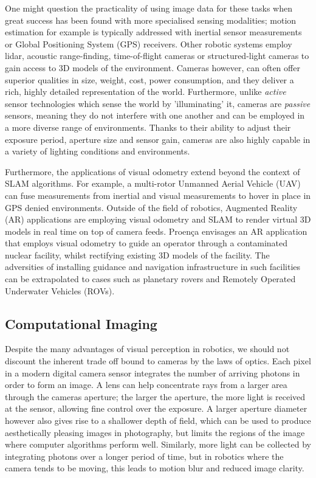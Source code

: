 One might question the practicality of using image data for these tasks when great success has been found with more specialised sensing modalities; motion estimation for example is typically addressed with inertial sensor measurements or Global Positioning System (GPS) receivers. Other robotic systems employ lidar, acoustic range-finding, time-of-flight cameras or structured-light cameras to gain access to 3D models of the environment. Cameras however, can often offer superior qualities in size, weight, cost, power consumption, and they deliver a rich, highly detailed representation of the world. Furthermore, unlike \textit{active} sensor technologies which sense the world by 'illuminating' it, cameras are \textit{passive} sensors, meaning they do not interfere with one another and can be employed in a more diverse range of environments. Thanks to their ability to adjust their exposure period, aperture size and sensor gain, cameras are also highly capable in a variety of lighting conditions and environments. 

Furthermore, the applications of visual odometry extend beyond the context of SLAM algorithms. For example, a multi-rotor Unmanned Aerial Vehicle (UAV) can fuse measurements from inertial and visual measurements to hover in place in GPS denied environments. Outside of the field of robotics, Augmented Reality (AR) applications are employing visual odometry and SLAM to render virtual 3D models in real time on top of camera feeds. Proença \cite{proenca2018rgbd} envisages an AR application that employs visual odometry to guide an operator through a contaminated nuclear facility, whilst rectifying existing 3D models of the facility. The adversities of installing guidance and navigation infrastructure in such facilities can be extrapolated to cases such as planetary rovers and Remotely Operated Underwater Vehicles (ROVs).


\subsection{Computational Imaging}

Despite the many advantages of visual perception in robotics, we should not discount the inherent trade off bound to cameras by the laws of optics. Each pixel in a modern digital camera sensor integrates the number of arriving photons in order to form an image. A lens can help concentrate rays from a larger area through the cameras aperture; the larger the aperture, the more light is received at the sensor, allowing fine control over the exposure. A larger aperture diameter however also gives rise to a shallower depth of field, which can be used to produce aesthetically pleasing images in photography, but limits the regions of the image where computer algorithms perform well. Similarly, more light can be collected by integrating photons over a longer period of time, but in robotics where the camera tends to be moving, this leads to motion blur and reduced image clarity.

